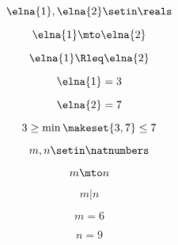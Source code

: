 {\begin{forslides}
        \begin{equation}
            \label{eq:combination-009}
            \elna{1},\elna{2}\setin \reals
        \end{equation}

        \begin{equation}
            \label{eq:combination-010}
            \elna{1} \mto \elna{2}
        \end{equation}

        \begin{equation}
            \label{eq:combination-011}
            \elna{1}\Rleq \elna{2}
        \end{equation}

        \begin{equation}
            \label{eq:combination-012}
            \elna{1} = 3
        \end{equation}

        \begin{equation}
            \label{eq:combination-013}
            \elna{2} = 7
        \end{equation}

        \begin{equation}
            \label{eq:combination-014}
            3 \geq \min \makeset{3, 7} \leq 7
        \end{equation}

        \begin{equation}
            \label{eq:combination-015}
            m, n \setin \natnumbers
        \end{equation}

        \begin{equation}
            \label{eq:combination-016}
            m \mto n
        \end{equation}

        \begin{equation}
            \label{eq:combination-017}
            m | n
        \end{equation}

        \begin{equation}
            \label{eq:combination-018}
            m = 6
        \end{equation}

        \begin{equation}
            \label{eq:combination-019}
            n = 9
        \end{equation}


\end{forslides}}
